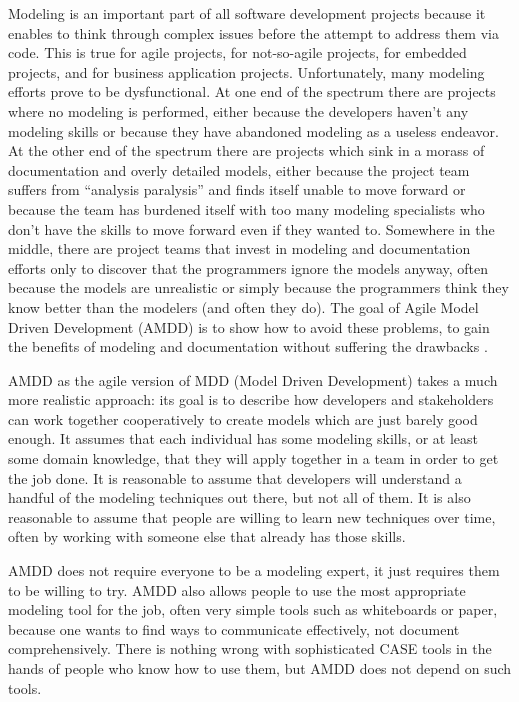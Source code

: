 \documentclass[10pt, a4paper, twocolumn]{article}
\begin{document}
Modeling is an important part of all software development projects because it enables to think through complex issues before the attempt to address them via code. This is true for agile projects, for not-so-agile projects, for embedded projects, and for business application projects. Unfortunately, many modeling efforts prove to be dysfunctional. At one end of the spectrum there are projects where no modeling is performed, either because the developers haven’t any modeling skills or because they have abandoned modeling as a useless endeavor. At the other end of the spectrum there are projects which sink in a morass of documentation and overly detailed models, either because the project team suffers from “analysis paralysis” and finds itself unable to move forward or because the team has burdened itself with too many modeling specialists who don’t have the skills to move forward even if they wanted to. Somewhere in the middle, there are project teams that invest in modeling and documentation efforts only to discover that the programmers ignore the models anyway, often because the models are unrealistic or simply because the programmers think they know better than the modelers (and often they do). The goal of Agile Model Driven Development (AMDD) is to show how to avoid these problems, to gain the benefits of modeling and documentation without suffering the drawbacks \cite{1}.

AMDD as the agile version of MDD (Model Driven Development) takes a much more realistic approach: its goal is to describe how developers and stakeholders can work together cooperatively to create models which are just barely good enough. It assumes that each individual has some modeling skills, or at least some domain knowledge, that they will apply together in a team in order to get the job done. It is reasonable to assume that developers will understand a handful of the modeling techniques out there, but not all of them. It is also reasonable to assume that people are willing to learn new techniques over time, often by working with someone else that already has those skills.

AMDD does not require everyone to be a modeling expert, it just requires them to be willing to try. AMDD also allows people to use the most appropriate modeling tool for the job, often very simple tools such as whiteboards or paper, because one wants to find ways to communicate effectively, not document comprehensively. There is nothing wrong with sophisticated CASE tools in the hands of people who know how to use them, but AMDD does not depend on such tools.
\end{document}

